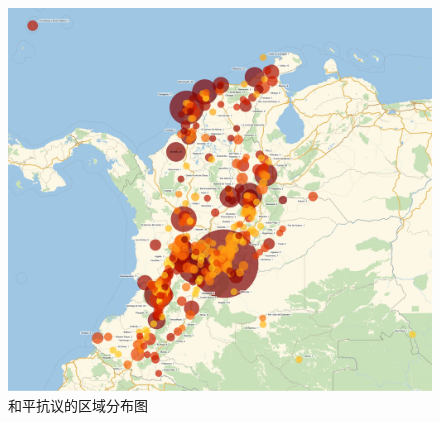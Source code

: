 \documentclass{phyasgn}\usepackage{nag}
\begin{document}
\begin{figure}[!h]
                    	\centering
                    	\includegraphics[width=1.0\linewidth]{pic/chart_peaceful.pdf}
                    	\caption{和平抗议的区域分布图}
                    	\end{figure}
\clearpage
\end{document}
